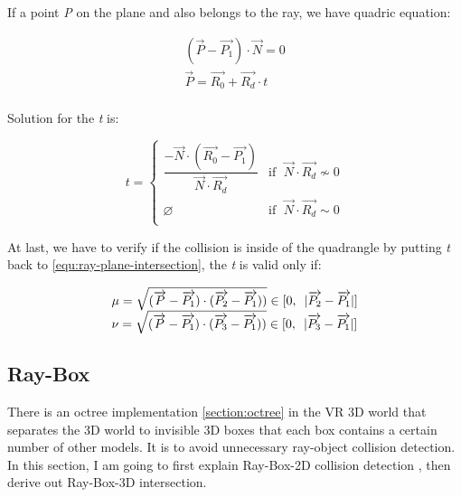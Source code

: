If a point \emph{P} on the plane and also belongs to the ray, we have quadric equation:

\begin{equation}
\label{equ:ray-plane-intersection}
\begin{array}{lr}
(\overrightarrow{P} - \overrightarrow{P_1}) \cdot \overrightarrow{N} = 0\\
\overrightarrow{P} = \overrightarrow{R_0} + \overrightarrow{R_d} \cdot t\\
\end{array}
\end{equation}

Solution for the \emph{t} is:

\[
t =
\begin{cases}
\dfrac{-\overrightarrow{N} \cdot (\overrightarrow{R_0} - \overrightarrow{P_1})}{\overrightarrow{N} \cdot \overrightarrow{R_d}} & \text{if }\;\overrightarrow{N} \cdot \overrightarrow{R_d} \nsim 0\\
\varnothing & \text{if }\;\overrightarrow{N} \cdot \overrightarrow{R_d} \sim 0\\
\end{cases}
\]

At last, we have to verify if the collision is inside of the quadrangle by putting \emph{t} back to \ref{equ:ray-plane-intersection}, \cite{user3146587.ray-plane.2014} the \emph{t} is valid only if:

\[
\begin{array}{lr}
\mu = \sqrt{(\overrightarrow{P} - \overrightarrow{P_1}) \cdot (\overrightarrow{P_2} - \overrightarrow{P_1}))} \in [0,\enspace\lvert \overrightarrow{P_2} - \overrightarrow{P_1} \rvert]\\
\nu = \sqrt{(\overrightarrow{P} - \overrightarrow{P_1}) \cdot (\overrightarrow{P_3} - \overrightarrow{P_1}))} \in [0,\enspace\lvert \overrightarrow{P_3} - \overrightarrow{P_1} \rvert]\\
\end{array}
\]

\subsection{Ray-Box}

There is an octree implementation \ref{section:octree} in the VR 3D world that separates the 3D world to invisible 3D boxes that each box contains a certain number of other models. It is to avoid unnecessary ray-object collision detection. In this section, I am going to first explain Ray-Box-2D collision detection \cite{tavian.ray-box-2d.2011}, then derive out Ray-Box-3D intersection.

